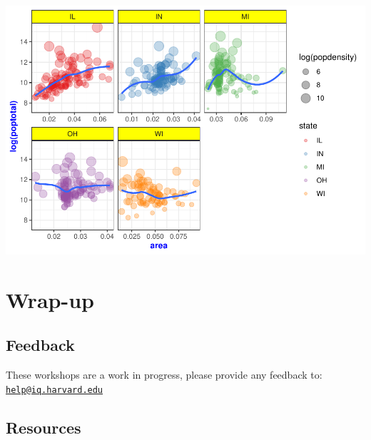 \documentclass[]{book}
\begin{document}
\includegraphics{R/Rgraphics/figures/unnamed-chunk-215-1.pdf}

\hypertarget{wrap-up-3}{%
\section{Wrap-up}\label{wrap-up-3}}

\hypertarget{feedback-3}{%
\subsection{Feedback}\label{feedback-3}}

These workshops are a work in progress, please provide any feedback to: \href{mailto:help@iq.harvard.edu}{\nolinkurl{help@iq.harvard.edu}}

\hypertarget{resources-4}{%
\subsection{Resources}\label{resources-4}}
\end{document}

